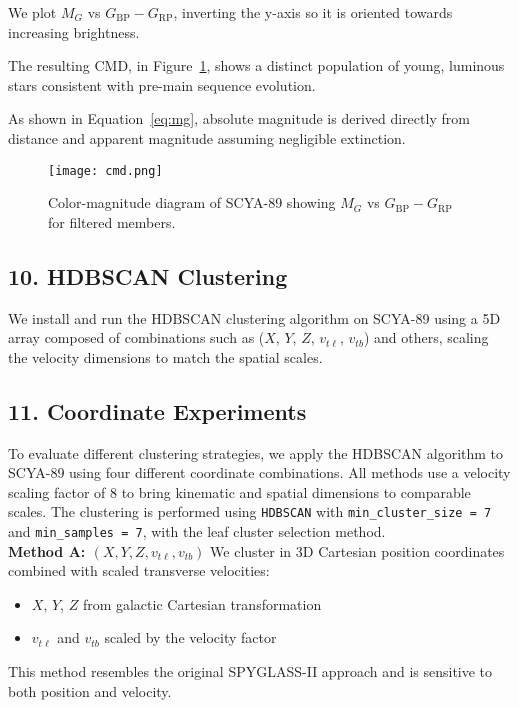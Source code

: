 \documentclass[11pt]{article}
\begin{document}
We plot $M_G$ vs $G_{\text{BP}} - G_{\text{RP}}$, inverting the y-axis so it is oriented towards increasing brightness.

The resulting CMD, in Figure~\ref{fig:cmd}, shows a distinct population of young, luminous stars consistent with pre-main sequence evolution. 

As shown in Equation~\ref{eq:mg}, absolute magnitude is derived directly from distance and apparent magnitude assuming negligible extinction.

\begin{figure}[H]
    \centering
    \texttt{[image: cmd.png]}
    \caption{Color-magnitude diagram of SCYA-89 showing $M_G$ vs $G_{\text{BP}} - G_{\text{RP}}$ for filtered members.}
    \label{fig:cmd}
\end{figure}


\subsection*{10. HDBSCAN Clustering}
We install and run the HDBSCAN clustering algorithm on SCYA-89 using a 5D array composed of combinations such as ($X$, $Y$, $Z$, $v_{t\ell}$, $v_{tb}$) and others, scaling the velocity dimensions to match the spatial scales.


\subsection*{11. Coordinate Experiments}
To evaluate different clustering strategies, we apply the HDBSCAN algorithm to SCYA-89 using four different coordinate combinations. All methods use a velocity scaling factor of 8 to bring kinematic and spatial dimensions to comparable scales. The clustering is performed using \texttt{HDBSCAN} with \texttt{min\_cluster\_size = 7} and \texttt{min\_samples = 7}, with the leaf cluster selection method.\\

\textbf{Method A: $(X, Y, Z, v_{t\ell}, v_{tb})$}
We cluster in 3D Cartesian position coordinates combined with scaled transverse velocities:
\begin{itemize}
  \item $X$, $Y$, $Z$ from galactic Cartesian transformation
  \item $v_{t\ell}$ and $v_{tb}$ scaled by the velocity factor
\end{itemize}
This method resembles the original SPYGLASS-II approach and is sensitive to both position and velocity.\\
\end{document}
